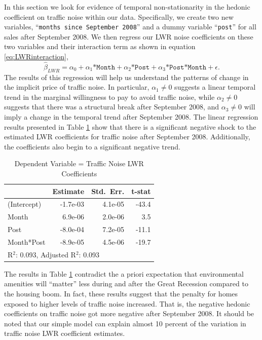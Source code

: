 \documentclass{article}\usepackage{graphicx, color}
\begin{document}
In this section we look for evidence of temporal non-stationarity in the hedonic coefficient on traffic noise within our data. Specifically, we create two new variables, ``\texttt{months since September 2008}'' and a dummy variable ``\texttt{post}'' for all sales after September 2008. We then regress our LWR noise coefficients on these two variables and their interaction term as shown in equation \eqref{eq:LWRinteraction}, 
\begin{equation}\label{eq:LWRinteraction}
\hat{\beta}_{LWR} = \alpha _0 + \alpha _1 \texttt{*Month} + \alpha _2  \texttt{*Post} + \alpha _3 \texttt{*Post*Month} + \epsilon.
\end{equation}
The results of this regression will help us understand the patterns of change in the implicit price of traffic noise. In particular, $\alpha_1 \neq 0$ suggests a linear temporal trend in the marginal willingness to pay to avoid traffic noise, while $\alpha_2 \neq 0$ suggests that there was a structural break after September 2008, and $\alpha_3 \neq 0$ will imply a change in the temporal trend after September 2008. The linear regression results presented in Table \ref{tab:betaMAX} show that there is a significant negative shock to the estimated LWR coefficients for traffic noise after September 2008. Additionally, the coefficients also begin to a significant negative trend.
\begin{table}[htb]
\caption{Dependent Variable = Traffic Noise LWR Coefficients}\label{tab:betaMAX}
\begin{center}
\begin{tabular}{lrrr}
           & Estimate & Std.\ Err. & t-stat  \\  \hline
(Intercept) & -1.7e-03 &  4.1e-05 &  -43.4   \\
Month       & 6.9e-06 &  2.0e-06  &   3.5    \\
Post        &-8.0e-04 &  7.2e-05  & -11.1    \\
Month*Post  &-8.9e-05 &  4.5e-06  & -19.7    \\ \hline
\multicolumn{4}{l}{R$^2$: 0.093,  Adjusted R$^2$: 0.093} \\
\end{tabular}
\end{center}
\end{table}

The results in Table \ref{tab:betaMAX} contradict the a priori expectation that environmental amenities will ``matter'' less during and after the Great Recession compared to the housing boom. In fact, these results suggest that the penalty for homes exposed to higher levels of traffic noise increased. That is, the negative hedonic coefficients on traffic noise got more negative after September 2008. It should be noted that our simple model can explain almost 10 percent of the variation in traffic noise LWR coefficient estimates. 
\end{document}
